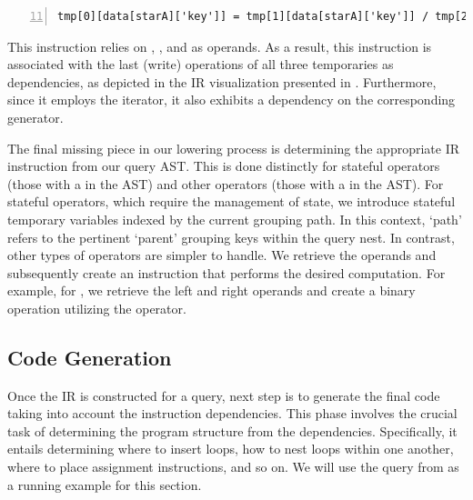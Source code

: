 \documentclass[runningheads]{llncs}
\begin{document}
\begin{lstlisting}[style=JavaScript, columns=flexible, numbers=left, firstnumber=11]
tmp[0][data[starA]['key']] = tmp[1][data[starA]['key']] / tmp[2]
\end{lstlisting}

This instruction relies on , , and  as operands.
As a result, this instruction is associated with the last (write) operations of all three
temporaries as dependencies, as depicted in the IR visualization presented in .
Furthermore, since it employs the  iterator, it also exhibits a dependency on the
corresponding generator.



The final missing piece in our lowering process is determining the appropriate
IR instruction from our query AST.
This is done distinctly for stateful operators (those with a
 in the AST) and other operators (those with a  in the AST).
For stateful operators, which require the management of state, we introduce stateful
temporary variables indexed by the current grouping path.
In this context, `path' refers to the pertinent `parent' grouping keys within the
query nest.
In contrast, other types of operators are simpler to handle.
We retrieve the operands and subsequently create an instruction that performs the
desired computation.
For example, for , we retrieve the left and right operands and create
a binary operation utilizing the \inline{+} operator.

\subsection{Code Generation}
Once the IR is constructed for a query, next step is to generate the final code
taking into account the instruction dependencies.
This phase involves the crucial task of determining the program structure from
the dependencies.
Specifically, it entails determining where to insert loops, how to nest loops
within one another, where to place assignment instructions, and so on. 
We will use the query from  as a running example for this
section.
\end{document}
